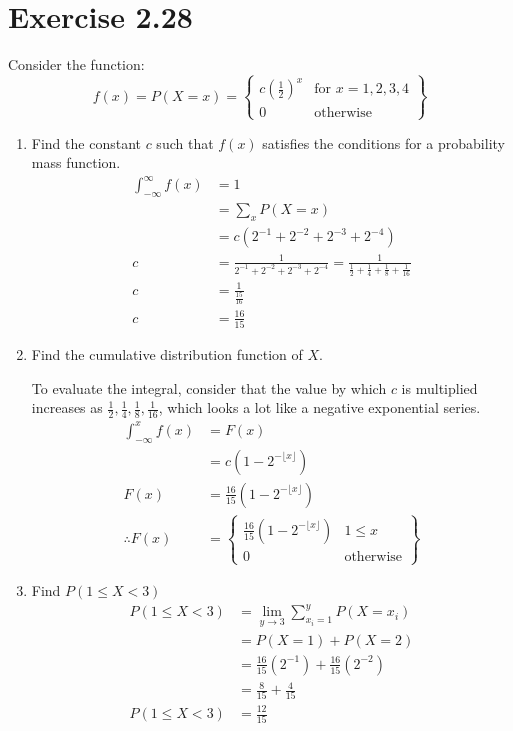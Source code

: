\documentclass{article}
\begin{document}
\section*{Exercise 2.28}
Consider the function:
\[ f(x) = P(X=x) = \left \{ \begin{array}{ll}
	c\left(\frac{1}{2}\right)^x & \text{for } x = 1,2,3,4\\
	0 & \text{otherwise}
\end{array} \right\} \]

\begin{enumerate}[\quad(a)]
	\item Find the constant $c$ such that $f(x)$ satisfies the conditions for a probability mass function.
	\begin{align*}
		\int_{-\infty}^\infty f(x) &= 1\\
		&= \sum_x P(X = x)\\
		&= c\left( 2^{-1} + 2^{-2} + 2^{-3} + 2^{-4} \right)\\
		c &= \frac{1}{2^{-1} + 2^{-2} + 2^{-3} + 2^{-4}} = \frac{1}{\tfrac{1}{2} + \tfrac{1}{4} + \tfrac{1}{8} + \tfrac{1}{16} }\\
		c &= \frac{1}{\tfrac{15}{16}}\\
		c&= \frac{16}{15}
	\end{align*}
	\item Find the cumulative distribution function of $X$.
	
	To evaluate the integral, consider that the value by which $c$ is multiplied increases as $\tfrac{1}{2}, \tfrac{1}{4}, \tfrac{1}{8}, \tfrac{1}{16}$, which looks a lot like a negative exponential series.
	\begin{align*}
		\int_{-\infty}^{x} f(x) &= F(x)\\
		&= c(1 - 2^{-\lfloor x \rfloor }) \\
		F(x) &= \frac{16}{15} (1 - 2^{-\lfloor x \rfloor })\\
		\therefore F(x) &= \left\{ 
		\begin{array}{ll}
			\frac{16}{15} (1 - 2^{-\lfloor x \rfloor }) & 1 \leq x\\
			0 & \text{otherwise}
		\end{array} \right\} 
	\end{align*}
	\item Find $P(1\leq X < 3)$
	\begin{align*}
		P(1\leq X < 3) &= \lim_{y\rightarrow 3} \sum_{x_i = 1}^{y} P(X=x_i)\\
		&= P(X=1) + P(X=2)\\
		&= \frac{16}{15}(2^{-1}) + \frac{16}{15}(2^{-2})\\
		&= \frac{8}{15} + \frac{4}{15}\\
		P(1\leq X < 3) &= \frac{12}{15}
	\end{align*}
\end{enumerate}
\newpage
\end{document}
